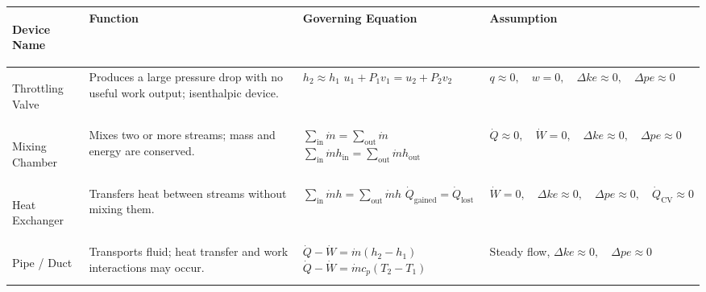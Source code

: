 \documentclass[12pt]{article}
\begin{document}

\renewcommand{\arraystretch}{1.5}

\begin{center}
\begin{tabularx}{\textwidth}{
|>{\bfseries\raggedright\arraybackslash}p{}
|>{\raggedright\arraybackslash}p{}
|>{\raggedright\arraybackslash}p{}
|>{\raggedright\arraybackslash}X|
}
\hline
\textbf{Device Name} &
\textbf{Function} &
\textbf{Governing Equation} &
\textbf{Assumption} \\
\hline

Throttling Valve &
Produces a large pressure drop with no useful work output; isenthalpic device. &
$\displaystyle
\boxed{h_2\approx h_1}
$
\newline
$\displaystyle
u_1+P_1v_1=u_2+P_2v_2
$ &
$\displaystyle
q\approx0,\quad
w=0,\quad
\Delta ke\approx0,\quad
\Delta pe\approx0$ \\
\hline

Mixing Chamber &
Mixes two or more streams; mass and energy are conserved. &
$\displaystyle
\sum_{\mathrm{in}}\dot m
=
\sum_{\mathrm{out}}\dot m
$
\newline
$\displaystyle
\sum_{\mathrm{in}}\dot m h_{\mathrm{in}}
=
\sum_{\mathrm{out}}\dot m h_{\mathrm{out}}
$ &
$\displaystyle
\dot Q\approx0,\quad
\dot W=0,\quad
\Delta ke\approx0,\quad
\Delta pe\approx0$ \\
\hline

Heat Exchanger &
Transfers heat between streams without mixing them. &
$\displaystyle
\sum_{\mathrm{in}}\dot m h
=
\sum_{\mathrm{out}}\dot m h
$
\newline
$\displaystyle
\dot Q_{\mathrm{gained}}
=
\dot Q_{\mathrm{lost}}
$ &
$\displaystyle
\dot W=0,\quad
\Delta ke\approx0,\quad
\Delta pe\approx0,\quad
\dot Q_{\mathrm{CV}}\approx0$ \\
\hline

Pipe / Duct &
Transports fluid; heat transfer and work interactions may occur. &
$\displaystyle
\dot Q-\dot W
=
\dot m(h_2-h_1)
$
\newline
$\displaystyle
\dot Q-\dot W
=
\dot m c_p(T_2-T_1)
$ &
Steady flow,
$\displaystyle
\Delta ke\approx0,\quad
\Delta pe\approx0$ \\
\hline

\end{tabularx}
\end{center}
\end{document}
